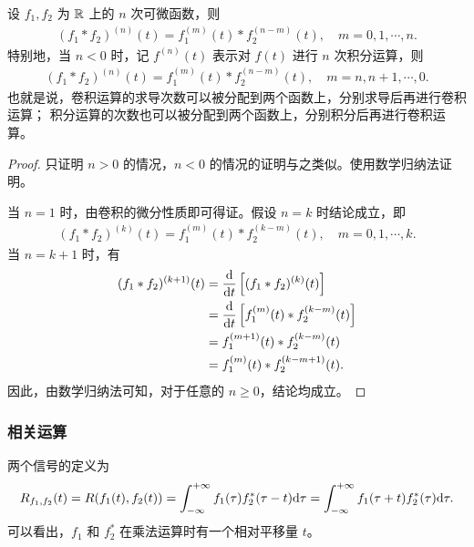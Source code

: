\begin{corollary}
    设 $f_1, f_2$ 为 $\mathbb{R}$ 上的 $n$ 次可微函数，则
    \begin{align*}
        (f_1 * f_2)^{(n)}(t) = f_1^{(m)}(t) * f_2^{(n - m)}(t), \quad m = 0, 1, \cdots, n.
    \end{align*}
    特别地，当 $n < 0$ 时，记 $f^{(n)}(t)$ 表示对 $f(t)$ 进行 $n$ 次积分运算，则
    \begin{align*}
        (f_1 * f_2)^{(n)}(t) = f_1^{(m)}(t) * f_2^{(n - m)}(t), \quad m = n, n + 1, \cdots, 0.
    \end{align*}
    也就是说，卷积运算的求导次数可以被分配到两个函数上，分别求导后再进行卷积运算；
    积分运算的次数也可以被分配到两个函数上，分别积分后再进行卷积运算。
\end{corollary}

\begin{proof}
    只证明 $n > 0$ 的情况，$n < 0$ 的情况的证明与之类似。使用数学归纳法证明。
    
    当 $n = 1$ 时，由卷积的微分性质即可得证。假设 $n = k$ 时结论成立，即
    \begin{align*}
        (f_1 * f_2)^{(k)}(t) = f_1^{(m)}(t) * f_2^{(k - m)}(t), \quad m = 0, 1, \cdots, k.
    \end{align*}
    当 $n = k + 1$ 时，有
    \begin{align*}
        (f_1 * f_2)^{(k + 1)}(t) & = \frac{\D}{\D{t}}\left[(f_1 * f_2)^{(k)}(t)\right] \\
        & = \frac{\D}{\D{t}}\left[f_1^{(m)}(t) * f_2^{(k - m)}(t)\right] \\
        & = f_1^{(m + 1)}(t) * f_2^{(k - m)}(t) \\
        & = f_1^{(m)}(t) * f_2^{(k - m + 1)}(t).
    \end{align*}
    因此，由数学归纳法可知，对于任意的 $n \ge 0$，结论均成立。
\end{proof}

\subsubsection{相关运算}

\begin{definition}
    两个信号的定义为
    \begin{align*}
        R_{f_1, f_2}(t)
        = R(f_1(t), f_2(t))
        = \int_{-\infty}^{+\infty}f_1(\tau)f_2^*(\tau - t)\mathrm{d}\tau
        = \int_{-\infty}^{+\infty}f_1(\tau + t)f_2^*(\tau)\mathrm{d}\tau.
    \end{align*}
    可以看出，$f_1$ 和 $f_2^*$ 在乘法运算时有一个相对平移量 $t$。
\end{definition}


